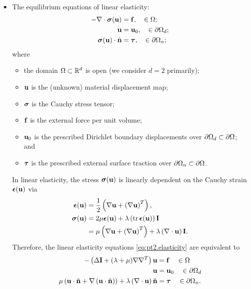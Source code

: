 \begin{itemize}
\item The equilibrium equations of linear elasticity:
\begin{subequations} \label{eq:pt2.elasticity}
\begin{align}
-\nabla \cdot \boldsymbol{\sigma}(\mathbf{u}) & = \mathbf{f}, \quad \in \Omega; \\
\mathbf{u} & = \mathbf{u}_0, \quad \in \partial\Omega_d; \\
\boldsymbol{\sigma}(\mathbf{u}) \cdot \hat{\mathbf{n}} & = \boldsymbol{\tau}, \quad \in \partial\Omega_n;
\end{align}
\end{subequations}
where
\begin{itemize}
\item the domain $\Omega \subset \mathbb{R}^d$ is open (we consider $d = 2$ primarily);
\item $\mathbf{u}$ is the (unknown) material displacement map;
\item $\boldsymbol{\sigma}$ is the Cauchy stress tensor;
\item $\mathbf{f}$ is the external force per unit volume;
\item $\mathbf{u}_0$ is the prescribed Dirichlet boundary displacements over $\partial\Omega_d \subset \partial\Omega$; and
\item $\boldsymbol{\tau}$ is the prescribed external surface traction over $\partial\Omega_n \subset \partial\Omega$.
\end{itemize}
In linear elasticity, the stress $\boldsymbol{\sigma}(\mathbf{u})$ is linearly dependent on the Cauchy strain $\boldsymbol{\epsilon}(\mathbf{u})$ via
\begin{align*}
\boldsymbol{\epsilon}(\mathbf{u}) & = \frac{1}{2} \left( \nabla \mathbf{u} + \left( \nabla \mathbf{u} \right)^T \right), \\
\boldsymbol{\sigma}(\mathbf{u})   & = 2 \mu \boldsymbol{\epsilon}(\mathbf{u}) + \lambda \left( \operatorname{tr} \boldsymbol{\epsilon}(\mathbf{u}) \right) \mathbf{I} \\
                 & = \mu \left( \nabla \mathbf{u} + \left( \nabla \mathbf{u} \right)^T \right) + \lambda \left( \nabla \cdot \mathbf{u} \right) \mathbf{I}.
\end{align*}
Therefore, the linear elasticity equations \eqref{eq:pt2.elasticity} are equivalent to
\begin{subequations} \label{eq:pt2.LE}
\begin{align}
-\left( \Delta \mathbf{I} + (\lambda + \mu) \nabla \nabla^T \right) \mathbf{u} & = \mathbf{f} \quad \in \Omega \\
\mathbf{u} & = \mathbf{u}_0 \quad \in \partial\Omega_d \\
\mu \left( \mathbf{u} \cdot \hat{\mathbf{n}} + \nabla \left( \mathbf{u} \cdot \hat{\mathbf{n}} \right) \right) + \lambda \left( \nabla \cdot \mathbf{u} \right) \hat{\mathbf{n}} & = \boldsymbol{\tau} \quad \in \partial\Omega_n.
\end{align}
\end{subequations}

\end{itemize}

